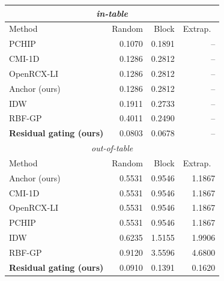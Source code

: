 \small
\begin{tabular}{lrrr}\toprule
\multicolumn{4}{c}{\emph{in-table}} \\\midrule
Method & Random & Block & Extrap.\ \\\midrule
PCHIP & 0.1070 & 0.1891 & -- \\
CMI-1D & 0.1286 & 0.2812 & -- \\
OpenRCX-LI & 0.1286 & 0.2812 & -- \\
Anchor (ours) & 0.1286 & 0.2812 & -- \\
IDW & 0.1911 & 0.2733 & -- \\
RBF-GP & 0.4011 & 0.2490 & -- \\
\textbf{Residual gating (ours)} & 0.0803 & 0.0678 & -- \\
\midrule\multicolumn{4}{c}{\emph{out-of-table}} \\\midrule
Method & Random & Block & Extrap.\ \\\midrule
Anchor (ours) & 0.5531 & 0.9546 & 1.1867 \\
CMI-1D & 0.5531 & 0.9546 & 1.1867 \\
OpenRCX-LI & 0.5531 & 0.9546 & 1.1867 \\
PCHIP & 0.5531 & 0.9546 & 1.1867 \\
IDW & 0.6235 & 1.5155 & 1.9906 \\
RBF-GP & 0.9120 & 3.5596 & 4.6800 \\
\textbf{Residual gating (ours)} & 0.0910 & 0.1391 & 0.1620 \\
\bottomrule\end{tabular}
